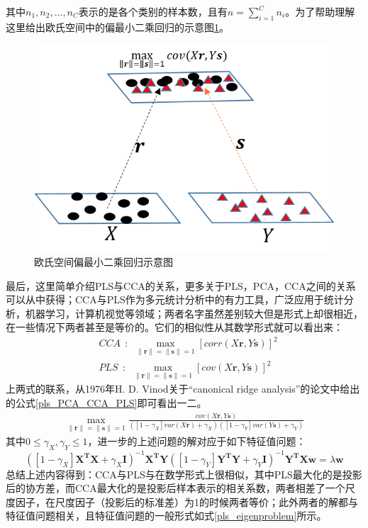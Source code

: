 其中$n_1,n_2,...,n_C$表示的是各个类别的样本数，且有$n=\sum_{i=1}^{C}n_i$。为了帮助理解这里给出欧氏空间中的偏最小二乘回归的示意图\ref{fig:PLS_Euclidean}。
\begin{figure}[h]
	\centering
	\includegraphics[width=0.5\linewidth]{source/PLS_Euclidean.png}
  	\caption{欧氏空间偏最小二乘回归示意图}
  	\label{fig:PLS_Euclidean}
\end{figure}

最后，这里简单介绍PLS与CCA的关系，更多关于PLS，PCA，CCA之间的关系可以从\cite{pls_PLSALL}中获得；CCA与PLS作为多元统计分析中的有力工具，广泛应用于统计分析，机器学习，计算机视觉等领域；两者名字虽然差别较大但是形式上却很相近，在一些情况下两者甚至是等价的。它们的相似性从其数学形式就可以看出来：
\begin{equation}
\label{pls_CCA_VS_PLS}
\begin{split}
&CCA~~:~~\max_{\|\bm{r}\|=\|\bm{s}\|=1}[corr(X\bm{r},Y\bm{s})]^2\\
&PLS~~:~~\max_{\|\bm{r}\|=\|\bm{s}\|=1}[cov(X\bm{r},Y\bm{s})]^2
\end{split}
\end{equation}
上两式的联系，从1976年H. D. Vinod关于“canonical ridge analysis”的论文\cite{pls_Canonical_ridge}中给出的公式\ref{pls_PCA_CCA_PLS}即可看出一二。
\begin{equation}
\label{pls_PCA_CCA_PLS}
\begin{split}
\max_{\|\bm{r}\|=\|\bm{s}\|=1}\frac{cov(X\bm{r},Y\bm{s})}{([1-\gamma_X]var(X\bm{r})+\gamma_X)([1-\gamma_Y]var(Y\bm{s})+\gamma_Y)}
\end{split}
\end{equation}
其中$0\leq \gamma_X,\gamma_Y \leq 1$，进一步的上述问题的解对应于如下特征值问题：
\begin{equation}
\label{pls_eigenproblem}
([1-\gamma_X]\bm{X^{T}X}+\gamma_X\bm{I})^{-1}\bm{X^{T}Y}([1-\gamma_Y]\bm{Y^{T}Y}+\gamma_Y\bm{I})^{-1}\bm{Y^{T}Xw}=\lambda\bm{w}
\end{equation}
总结上述内容得到：CCA与PLS与在数学形式上很相似，其中PLS最大化的是投影后的协方差，而CCA最大化的是投影后样本表示的相关系数，两者相差了一个尺度因子，在尺度因子（投影后的标准差）为1的时候两者等价；此外两者的解都与特征值问题相关，且特征值问题的一般形式如式\ref{pls_eigenproblem}所示。

